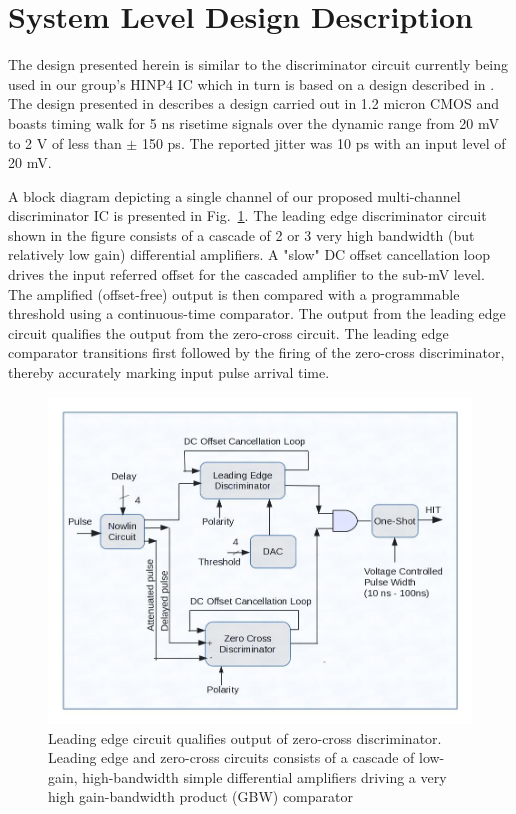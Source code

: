 \documentclass[12pt, onecolumn]{IEEEtran}
\begin{document}
\section*{System Level Design Description}
\noindent
The design presented herein is similar to the discriminator circuit currently being used in our group's HINP4 IC which in turn is based on a design described in \cite{507173}. The design presented in \cite{507173} describes a design carried out in 1.2 micron CMOS and boasts timing walk for 5 ns risetime signals over the dynamic range from 20 mV to 2 V of less than $\pm$ 150 ps.  The reported jitter was 10 ps with an input level of 20 mV.

\noindent
\newline
A block diagram depicting a single channel of our proposed multi-channel discriminator IC is presented in Fig.~\ref{BlockDiagram}. The leading edge discriminator circuit shown in the figure consists of a cascade of 2 or 3 very high bandwidth (but relatively low gain) differential amplifiers. A "slow" DC offset cancellation loop drives the input referred offset for the cascaded amplifier to the sub-mV level. The amplified (offset-free) output is then compared with a programmable threshold using a continuous-time comparator.  The output from the leading edge circuit qualifies the output from the zero-cross circuit.  The leading edge comparator transitions first followed by the firing of the zero-cross discriminator, thereby accurately marking input pulse arrival time. \\

\begin{figure}[htbp!]
	\centering
 	\includegraphics[scale=0.5,keepaspectratio=true]{./images/DISC16block.jpg}
 	\caption{Leading edge circuit qualifies output of zero-cross discriminator.  Leading edge and zero-cross circuits consists of a cascade of low-gain, high-bandwidth simple differential amplifiers driving a very high gain-bandwidth product (GBW) comparator }
 	\label{BlockDiagram}
\end{figure}
\end{document}
